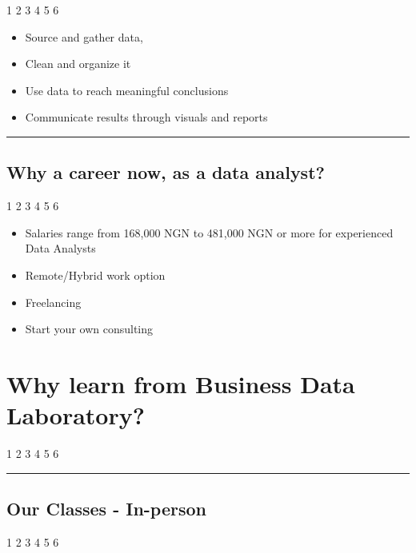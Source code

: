 \documentclass[
  letterpaper,
  DIV=11,
  numbers=noendperiod]{scrartcl}
\providecommand{\tightlist}{%
  \setlength{\itemsep}{0pt}\setlength{\parskip}{0pt}}\usepackage{longtable,booktabs,array}
\begin{document}
1 {2 3 4 5 6}

\begin{itemize}
\tightlist
\item
  Source and gather data,
\item
  Clean and organize it
\item
  Use data to reach meaningful conclusions
\item
  Communicate results through visuals and reports
\end{itemize}

\begin{center}\rule{0.5\linewidth}{0.5pt}\end{center}

\hypertarget{why-a-career-now-as-a-data-analyst}{%
\subsection{Why a career now, as a data
analyst?}\label{why-a-career-now-as-a-data-analyst}}

1 {2 3 4 5 6}

\begin{itemize}
\tightlist
\item
  Salaries range from 168,000 NGN to 481,000 NGN or more for experienced
  Data Analysts
\item
  Remote/Hybrid work option
\item
  Freelancing
\item
  Start your own consulting
\end{itemize}

\hypertarget{why-learn-from-business-data-laboratory}{%
\section{Why learn from Business Data
Laboratory?}\label{why-learn-from-business-data-laboratory}}

{1} 2 {3 4 5 6}

\begin{center}\rule{0.5\linewidth}{0.5pt}\end{center}

\hypertarget{our-classes---in-person}{%
\subsection{Our Classes - In-person}\label{our-classes---in-person}}

{1} 2 {3 4 5 6}
\end{document}
